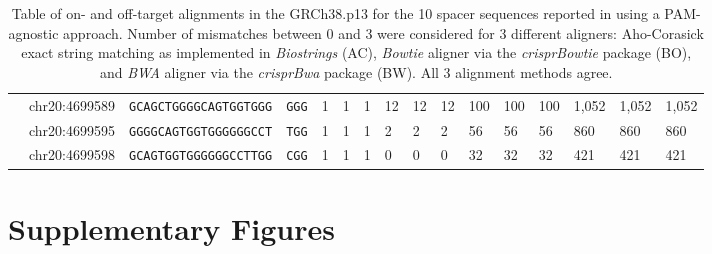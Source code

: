 \documentclass[pdftex,english,10pt]{article}
\begin{document}
\begin{table}[h]
{\begin{tabular}{|l|lll|llllllllllll|}
                                           & chr20:4699589                                         & \texttt{GCAGCTGGGGCAGTGGTGGG}                        & \texttt{GGG}                                       & 1                     &           1                 & \multicolumn{1}{l|}{1}    & 12                    & 12                          & \multicolumn{1}{l|}{12}    & 100                    &       100                     & \multicolumn{1}{l|}{100}    & 1,052                 &  1,052                          &      1,052                    \\
                                           & chr20:4699595                                         & \texttt{GGGGCAGTGGTGGGGGGCCT}                        & \texttt{TGG}                                       & 1                     &         1                  & \multicolumn{1}{l|}{1}   & 2                     &      2                      & \multicolumn{1}{l|}{2}    & 56                    & 56                         & \multicolumn{1}{l|}{56}    & 860                   & 860                           &      860                     \\
                                           & chr20:4699598                                         & \texttt{GCAGTGGTGGGGGGCCTTGG}                        & \texttt{CGG}                                       & 1                     &          1                  & \multicolumn{1}{l|}{1}    & 0                     &      0                      & \multicolumn{1}{l|}{0}    & 32                    &   32                         & \multicolumn{1}{l|}{32}    & 421                   &           421                   &        421                  \\ \hline
\end{tabular}
}
\caption{Table of on- and off-target alignments in the GRCh38.p13 for the 10 spacer sequences reported in \citet{multicrispr} using a PAM-agnostic approach. Number of mismatches between 0 and 3 were considered for 3 different aligners: Aho-Corasick exact string matching as implemented in \textit{Biostrings} (AC), \textit{Bowtie} aligner via the \textit{crisprBowtie} package (BO), and \textit{BWA} aligner via the \textit{crisprBwa} package (BW). All 3 alignment methods agree. }
\label{supptab:offtargets}
\end{table}


\clearpage
\section*{Supplementary Figures}
\end{document}
